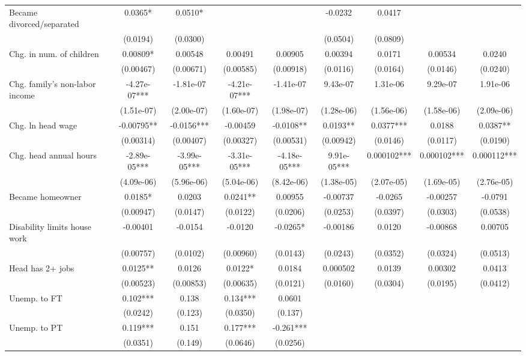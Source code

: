\begin{tabular}{lcccccccc}
Became divorced/separated & 0.0365* & 0.0510* &  &  & -0.0232 & 0.0417 &  &  \\
 & (0.0194) & (0.0300) &  &  & (0.0504) & (0.0809) &  &  \\
Chg. in num. of children & 0.00809* & 0.00548 & 0.00491 & 0.00905 & 0.00394 & 0.0171 & 0.00534 & 0.0240 \\
 & (0.00467) & (0.00671) & (0.00585) & (0.00918) & (0.0116) & (0.0164) & (0.0146) & (0.0240) \\
Chg. family's non-labor income & -4.27e-07*** & -1.81e-07 & -4.21e-07*** & -1.41e-07 & 9.43e-07 & 1.31e-06 & 9.29e-07 & 1.91e-06 \\
 & (1.51e-07) & (2.00e-07) & (1.60e-07) & (1.98e-07) & (1.28e-06) & (1.56e-06) & (1.58e-06) & (2.09e-06) \\
Chg. ln head wage & -0.00795** & -0.0156*** & -0.00459 & -0.0108** & 0.0193** & 0.0377*** & 0.0188 & 0.0387** \\
 & (0.00314) & (0.00407) & (0.00327) & (0.00531) & (0.00942) & (0.0146) & (0.0117) & (0.0190) \\
Chg. head annual hours & -2.89e-05*** & -3.99e-05*** & -3.31e-05*** & -4.18e-05*** & 9.91e-05*** & 0.000102*** & 0.000102*** & 0.000112*** \\
 & (4.09e-06) & (5.96e-06) & (5.04e-06) & (8.42e-06) & (1.38e-05) & (2.07e-05) & (1.69e-05) & (2.76e-05) \\
Became homeowner & 0.0185* & 0.0203 & 0.0241** & 0.00955 & -0.00737 & -0.0265 & -0.00257 & -0.0791 \\
 & (0.00947) & (0.0147) & (0.0122) & (0.0206) & (0.0253) & (0.0397) & (0.0303) & (0.0538) \\
Disability limits house work & -0.00401 & -0.0154 & -0.0120 & -0.0265* & -0.00186 & 0.0120 & -0.00868 & 0.00705 \\
 & (0.00757) & (0.0102) & (0.00960) & (0.0143) & (0.0243) & (0.0352) & (0.0324) & (0.0513) \\
Head has 2+ jobs & 0.0125** & 0.0126 & 0.0122* & 0.0184 & 0.000502 & 0.0139 & 0.00302 & 0.0413 \\
 & (0.00523) & (0.00853) & (0.00635) & (0.0121) & (0.0160) & (0.0304) & (0.0195) & (0.0412) \\
Unemp. to FT & 0.102*** & 0.138 & 0.134*** & 0.0601 &  &  &  &  \\
 & (0.0242) & (0.123) & (0.0350) & (0.137) &  &  &  &  \\
Unemp. to PT & 0.119*** & 0.151 & 0.177*** & -0.261*** &  &  &  &  \\
 & (0.0351) & (0.149) & (0.0646) & (0.0256) &  &  &  &  \\

\end{tabular}
